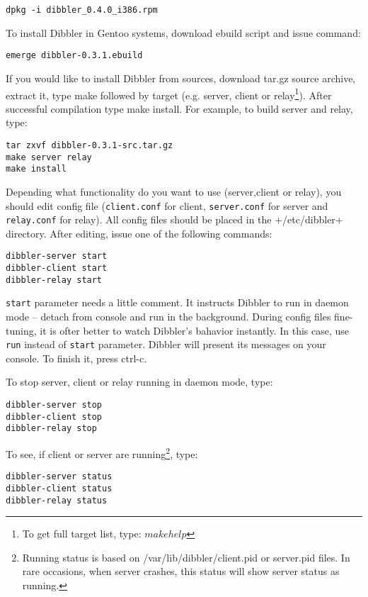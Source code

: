 \begin{verbatim}
dpkg -i dibbler_0.4.0_i386.rpm 
\end{verbatim}

To install Dibbler in Gentoo systems, download ebuild script and issue
command:

\begin{verbatim}
emerge dibbler-0.3.1.ebuild
\end{verbatim}

If you would like to install Dibbler from sources, download tar.gz
source archive, extract it, type make followed by target (e.g. server,
client or relay\footnote{To get full target list, type: $make
  help$}). After successful compilation type make install. For
example, to build server and relay, type:

\begin{verbatim}
tar zxvf dibbler-0.3.1-src.tar.gz
make server relay
make install
\end{verbatim}

Depending what functionality do you want to use (server,client or relay),
you should edit config file (\verb+client.conf+ for client, \verb+server.conf+
for server and \verb+relay.conf+ for relay). All config files should
be placed in the +/etc/dibbler+ directory. After editing, issue one of
the following commands:

\begin{verbatim}
dibbler-server start
dibbler-client start
dibbler-relay start
\end{verbatim}

\verb+start+ parameter needs a little comment. It
instructs Dibbler to run in daemon mode -- detach from console and run
in the background. During config files fine-tuning, it is ofter better
to watch Dibbler's bahavior instantly. In this case, use \verb+run+
instead of \verb+start+ parameter. Dibbler will present its messages on
your console. To finish it, press ctrl-c.

To stop server, client or relay running in daemon mode, type:
\begin{verbatim}
dibbler-server stop
dibbler-client stop
dibbler-relay stop
\end{verbatim}

To see, if client or server are running\footnote{Running status is
  based on /var/lib/dibbler/client.pid or server.pid files. In rare
  occasions, when server crashes, this status will show server status as running.}, type:
\begin{verbatim}
dibbler-server status
dibbler-client status
dibbler-relay status
\end{verbatim}


